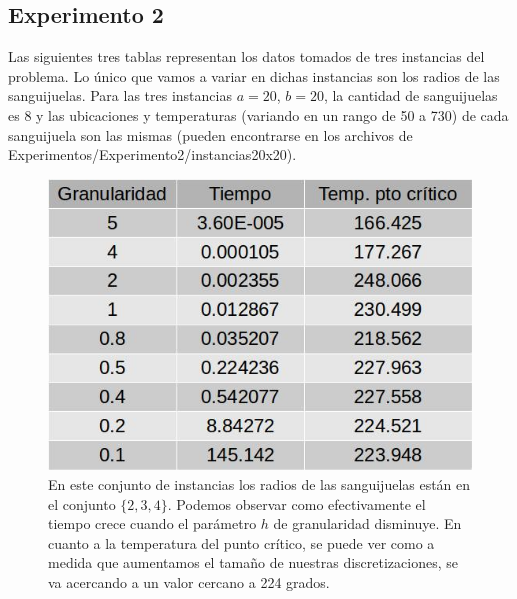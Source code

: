 \subsection{Experimento 2}
Las siguientes tres tablas representan los datos tomados de tres instancias del problema. Lo único que vamos a variar en dichas instancias son los radios de las sanguijuelas. Para las tres instancias $a = 20$, $b = 20$, la cantidad de sanguijuelas es 8 y las ubicaciones y temperaturas (variando en un rango de 50 a 730) de cada sanguijuela son las mismas (pueden encontrarse en los archivos de Experimentos/Experimento2/instancias20x20).
\newline
\begin{figure}[H]
\centering
\includegraphics[scale=0.4]{instancia20x20_1.jpg}\caption{En este conjunto de instancias los radios de las sanguijuelas están en el conjunto $\{2, 3, 4\}$. Podemos observar como efectivamente el tiempo crece cuando el parámetro $h$ de granularidad disminuye. En cuanto a la temperatura del punto crítico, se puede ver como a medida que aumentamos el tamaño de nuestras discretizaciones, se va acercando a un valor cercano a 224 grados.}
\end{figure}

